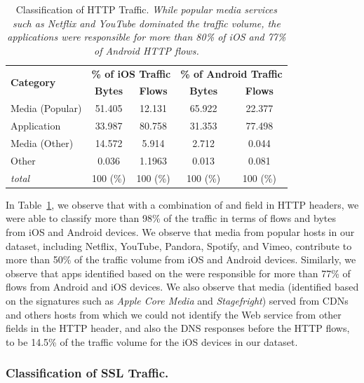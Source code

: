 \begin{table}
\centering
\begin{small}
\begin{tabular}{|p{}|c|c|c|c|}
\hline
\multirow{2}{*}{\bf Category} & \multicolumn{2}{c|}{\bf \% of iOS Traffic } &  \multicolumn{2}{c|}{\bf \% of Android Traffic } \tabularnewline
\cline{2-5}
  & {\bf Bytes}  & {\bf Flows} & {\bf Bytes} & {\bf Flows}   \tabularnewline
\hline
Media (Popular)         & 51.405  & 12.131 & 65.922 & 22.377 \tabularnewline
\hline
Application             & 33.987  & 80.758 & 31.353 & 77.498 \tabularnewline
\hline
Media (Other)           & 14.572  &  5.914 &  2.712 &  0.044 \tabularnewline
\hline
Other                   &  0.036  & 1.1963 &  0.013 &  0.081 \tabularnewline
\hline
{\em total}             & 100 (\%)& 100 (\%)& 100 (\%) & 100 (\%) \tabularnewline
\hline
\end{tabular}
\end{small}
\caption{Classification of HTTP Traffic. \emph{While popular media services such as Netflix and YouTube dominated the traffic volume, the applications were responsible for more than 80\% of iOS and 77\% of Android HTTP flows.}}
\label{tab:classify-http}
\vspace{\postfigspace}
\end{table}

In Table~\ref{tab:classify-http}, we observe that with a combination of \useragent and \httphost field in HTTP headers, we were able to classify more than 98\% of the traffic in terms of flows and bytes from iOS and Android devices.
We observe that media from popular hosts in our \mobWild dataset, including Netflix, YouTube, Pandora, Spotify, and Vimeo, contribute to more than 50\% of the traffic volume from iOS and Android devices.
Similarly, we observe that apps identified based on the \useragent  were responsible for more than 77\% of flows from Android and iOS devices. 
We also observe that media (identified based on the signatures such as \emph{Apple Core Media} and \emph{Stagefright}) served from CDNs and others hosts from which we could not identify the Web service from other fields in the HTTP header, and also the DNS responses before the HTTP flows, to be 14.5\% of the traffic volume for the iOS devices in our dataset.

\subsubsection{Classification of SSL Traffic.}


